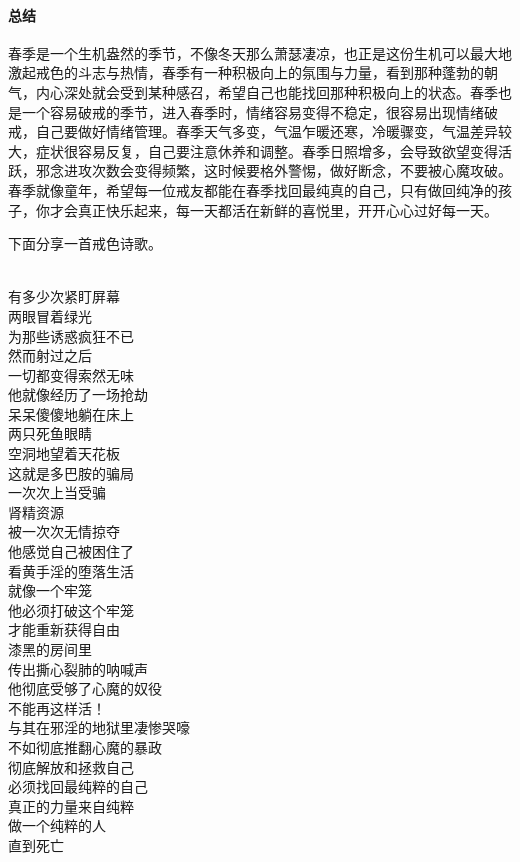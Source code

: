 \paragraph*{总结}

春季是一个生机盎然的季节，不像冬天那么萧瑟凄凉，也正是这份生机可以最大地激起戒色的斗志与热情，春季有一种积极向上的氛围与力量，看到那种蓬勃的朝气，内心深处就会受到某种感召，希望自己也能找回那种积极向上的状态。春季也是一个容易破戒的季节，进入春季时，情绪容易变得不稳定，很容易出现情绪破戒，自己要做好情绪管理。春季天气多变，气温乍暖还寒，冷暖骤变，气温差异较大，症状很容易反复，自己要注意休养和调整。春季日照增多，会导致欲望变得活跃，邪念进攻次数会变得频繁，这时候要格外警惕，做好断念，不要被心魔攻破。春季就像童年，希望每一位戒友都能在春季找回最纯真的自己，只有做回纯净的孩子，你才会真正快乐起来，每一天都活在新鲜的喜悦里，开开心心过好每一天。

下面分享一首戒色诗歌。

\begin{poem}[找回最纯粹的自己]
    \begin{multicols}{3}
        \centering~\\
        有多少次紧盯屏幕 \\ 两眼冒着绿光 \\ 为那些诱惑疯狂不已 \\ 然而射过之后 \\ 一切都变得索然无味 \\ 他就像经历了一场抢劫 \\ 呆呆傻傻地躺在床上 \\ 两只死鱼眼睛 \\ 空洞地望着天花板 \\ 这就是多巴胺的骗局 \\ 一次次上当受骗 \\ 肾精资源 \\ 被一次次无情掠夺 \\ 他感觉自己被困住了 \\ 看黄手淫的堕落生活 \\ 就像一个牢笼 \\ 他必须打破这个牢笼 \\ 才能重新获得自由 \\ 漆黑的房间里 \\ 传出撕心裂肺的呐喊声 \\ 他彻底受够了心魔的奴役 \\ 不能再这样活！ \\ 与其在邪淫的地狱里凄惨哭嚎 \\ 不如彻底推翻心魔的暴政 \\ 彻底解放和拯救自己 \\ 必须找回最纯粹的自己 \\ 真正的力量来自纯粹 \\ 做一个纯粹的人 \\ 直到死亡
    \end{multicols}
\end{poem}

